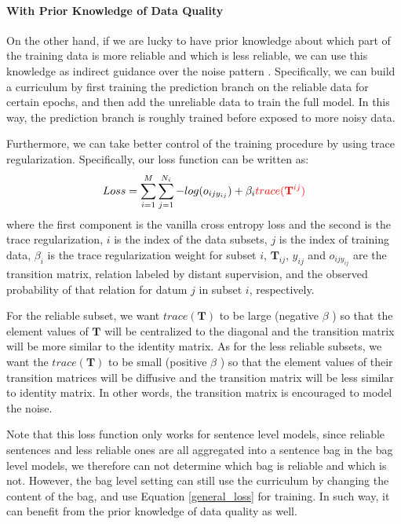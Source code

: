 \paragraph{With Prior Knowledge of Data Quality}
On the other hand, if we are lucky to have prior knowledge about which part of the training data is more reliable and which is less reliable, we can use this knowledge as indirect guidance over the noise pattern . Specifically, we can build a curriculum by first training the prediction branch on the reliable data for certain epochs, and then add the unreliable data to train the full model. In this way, the prediction branch is roughly trained before exposed to more noisy data.

Furthermore, we can take better control of the training procedure by using trace regularization.
Specifically, our loss function can be written as:
%
\begin{equation}
\begin{aligned}
Loss=\sum_{i=1}^M{\sum_{j=1}^{N_i}{-log(o_{ijy_{ij}})}} + \beta_i \textcolor{red}{trace(\mathbf{T}^{ij})}
\end{aligned}
\end{equation}
where the first component is the vanilla cross entropy loss  and the second is the trace regularization, $i$ is the index of the data subsets, $j$ is the index of training data, $\beta_i$ is the trace regularization weight for subset $i$, $\mathbf{T}_{ij}$, $y_{ij}$ and $o_{ijy_{ij}}$ are the transition matrix, relation labeled by distant supervision, and the observed probability of that relation for datum $j$ in subset $i$, respectively.

For the reliable subset, we want $trace(\mathbf{T})$ to be large (negative $\beta$ ) so that the element values of $\mathbf{T}$ will be centralized to the diagonal and the transition matrix will be more similar to the identity matrix. As for the  less reliable subsets, we want the $trace(\mathbf{T})$ to be small (positive $\beta$ ) so that the element values of their transition matrices will be diffusive and the transition matrix will be less similar to identity matrix. In other words, the transition matrix is encouraged to model the noise. 

Note that this loss function only works for sentence level models, since reliable sentences and less reliable ones are all aggregated into a sentence bag in the bag level models,  we therefore can not determine which bag is reliable and which is not. However, the bag level setting can still use the curriculum by changing the content of the bag,   and use Equation \ref{general_loss} for training. In such way, it can benefit from the prior knowledge of data quality as well.




